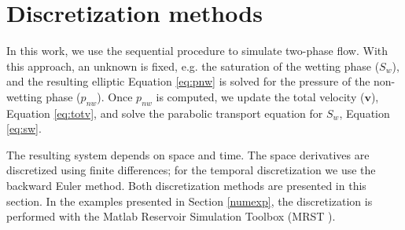 \documentclass[12pt]{article}
\begin{document}
\section{Discretization methods}\label{numet}
\hspace{0.5cm} In this work, we use the sequential procedure to simulate two-phase flow. With this approach, an unknown is fixed, 
e.g. the saturation of the wetting phase ($S_w$), and the resulting elliptic Equation \eqref{eq:pnw} is solved for the pressure of 
the non-wetting phase ($p_{nw}$). Once $p_{nw}$ is computed, we update the total velocity ($\mathbf{v}$), Equation \eqref{eq:totv}, 
and solve the parabolic transport equation for $S_w$, Equation \eqref{eq:sw}. \par
 The resulting system depends on space and time. The space derivatives are discretized using finite differences; for the temporal 
 discretization we use the backward Euler method. Both discretization methods are presented in this section. 
 In the examples presented in Section \ref{numexp}, the discretization is performed with the Matlab Reservoir Simulation Toolbox (MRST \cite{Lie13}).
\end{document}
